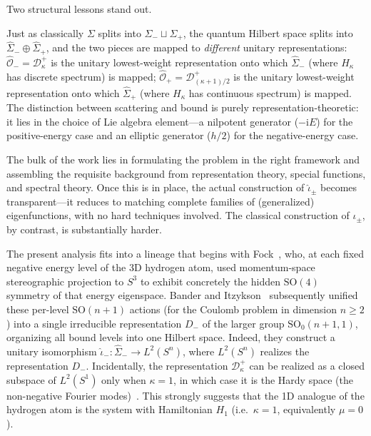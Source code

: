 \documentclass[11pt]{article}
\theoremstyle{plain}
\theoremstyle{definition}
\theoremstyle{remark}
\newcommand{\SO}{\mathrm{SO}}
\newcommand{\Sigmah}{\widehat{\Sigma}}
\newcommand{\OOh}{\widehat{\mathcal{O}}}
\newcommand{\D}{\mathcal{D}}
\newcommand{\ii}{\mathrm{i}}
\begin{document}
Two structural lessons stand out.
\begin{description}[leftmargin=1em,style=nextline]
  \item[(a) Quantum S-duality parallels the classical decomposition.]
    Just as classically $\Sigma$ splits into $\Sigma_{-}\sqcup\Sigma_{+}$,
    the quantum Hilbert space splits into $\Sigmah_{-}\oplus\Sigmah_{+}$,
    and the two pieces are mapped to \emph{different} unitary
    representations:
    $\OOh_{-}=\D^{+}_{\kappa}$ is the unitary lowest-weight representation onto
    which $\Sigmah_{-}$ (where $H_{\kappa}$ has discrete spectrum) is mapped;
    $\OOh_{+}=\D^{+}_{(\kappa+1)/2}$ is the unitary lowest-weight representation
    onto which $\Sigmah_{+}$ (where $H_{\kappa}$ has continuous spectrum) is mapped.
    The distinction between scattering and bound is purely
    representation-theoretic: it lies in the choice of Lie algebra
    element---a nilpotent generator ($-\ii E$) for the positive-energy case
    and an elliptic generator ($h/2$) for the negative-energy case.
  \item[(b) Quantum construction is easier than classical.]
    The bulk of the work lies in formulating the problem in the right
    framework and assembling the requisite background from representation
    theory, special functions, and spectral theory.
    Once this is in place, the actual construction of
    $\hat\iota_{\pm}$ becomes transparent---it reduces to matching
    complete families of (generalized) eigenfunctions, with no
    hard techniques involved.
    The classical construction of $\iota_{\pm}$, by contrast, is substantially harder.
\end{description}

The present analysis fits into a lineage that begins with
Fock~\cite{Fock1935}, who, at each fixed negative energy level of the
3D hydrogen atom, used momentum-space stereographic projection to
$S^{3}$ to exhibit concretely the hidden $\SO(4)$ symmetry of that energy
eigenspace. Bander and
Itzykson~\cite{BanderItzykson1966I} subsequently
unified these per-level $\SO(n+1)$ actions (for the Coulomb problem in dimension $n\ge 2$) into a single irreducible
representation $D_{-}$ of the larger group $\SO_0(n+1,1)$, organizing all
bound levels into one Hilbert space. Indeed, they construct a unitary isomorphism
$\hat\iota_{-}\colon\Sigmah_{-}\to L^{2}(S^{n})$, where $L^{2}(S^{n})$ realizes the
representation $D_{-}$. Incidentally, the representation $\D^{+}_{\kappa}$ can be realized as a closed subspace of $L^{2}(S^{1})$ only when $\kappa=1$, in which case it is the Hardy space (the non-negative Fourier modes)~\cite{Knapp1986}. This strongly suggests that the 1D analogue of the hydrogen atom is the system with Hamiltonian $H_{1}$ (i.e.\ $\kappa=1$, equivalently $\mu=0$).
\end{document}
